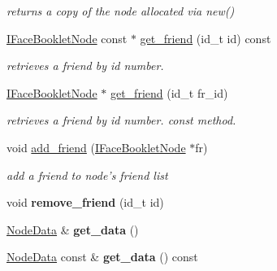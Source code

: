 \begin{DoxyCompactItemize}
\begin{DoxyCompactList}\small\item\em returns a copy of the node allocated via new() \end{DoxyCompactList}\item 
\hyperlink{structfb_1_1_i_face_booklet_node}{I\+Face\+Booklet\+Node} const $\ast$ \hyperlink{classfb_1_1_profile_abd95cad4820c261601b20372f634bd2a}{get\+\_\+friend} (id\+\_\+t id) const 
\begin{DoxyCompactList}\small\item\em retrieves a friend by id number. \end{DoxyCompactList}\item 
\hyperlink{structfb_1_1_i_face_booklet_node}{I\+Face\+Booklet\+Node} $\ast$ \hyperlink{classfb_1_1_profile_a6c9f78b9cb0c1e30d22d17265736a956}{get\+\_\+friend} (id\+\_\+t fr\+\_\+id)
\begin{DoxyCompactList}\small\item\em retrieves a friend by id number. const method. \end{DoxyCompactList}\item 
\hypertarget{classfb_1_1_profile_a2090dc97786cb7cbabf2edf5065b0ddc}{void \hyperlink{classfb_1_1_profile_a2090dc97786cb7cbabf2edf5065b0ddc}{add\+\_\+friend} (\hyperlink{structfb_1_1_i_face_booklet_node}{I\+Face\+Booklet\+Node} $\ast$fr)}\label{classfb_1_1_profile_a2090dc97786cb7cbabf2edf5065b0ddc}

\begin{DoxyCompactList}\small\item\em add a friend to node's friend list \end{DoxyCompactList}\item 
\hypertarget{classfb_1_1_profile_a45472768709c2eb8665ce6e50e2fb5ce}{void {\bfseries remove\+\_\+friend} (id\+\_\+t id)}\label{classfb_1_1_profile_a45472768709c2eb8665ce6e50e2fb5ce}

\item 
\hypertarget{classfb_1_1_profile_a6a579e8b0adade2c3cd499882cf473fc}{\hyperlink{classfb_1_1_node_data}{Node\+Data} \& {\bfseries get\+\_\+data} ()}\label{classfb_1_1_profile_a6a579e8b0adade2c3cd499882cf473fc}

\item 
\hypertarget{classfb_1_1_profile_abc344e9cdafc14dafdaa74678a3cfa48}{\hyperlink{classfb_1_1_node_data}{Node\+Data} const \& {\bfseries get\+\_\+data} () const }\label{classfb_1_1_profile_abc344e9cdafc14dafdaa74678a3cfa48}


\end{DoxyCompactItemize}
